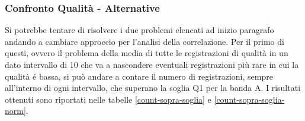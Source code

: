\begin{table}[H]
	\begin{minipage}{.5\textwidth}
		\centering
		\label{mvm-confusion1}
	\end{minipage}
	\begin{minipage}{.5\textwidth}
		\centering
		\label{mvm-confusion2}
	\end{minipage}
\end{table}


\subsubsection{Confronto Qualità - Alternative}
Si potrebbe tentare di risolvere i due problemi elencati ad inizio paragrafo andando a cambiare approccio per l'analisi della correlazione.
Per il primo di questi, ovvero il problema della media di tutte le registrazioni di qualità in un dato intervallo di 10 che va a nascondere eventuali registrazioni più rare in cui la qualità é bassa, si può andare a contare il numero di registrazioni, sempre all'interno di ogni intervallo, che superano la soglia Q1 per la banda A.
I risultati ottenuti sono riportati nelle tabelle \ref{count-sopra-soglia} e \ref{count-sopra-soglia-norm}.



